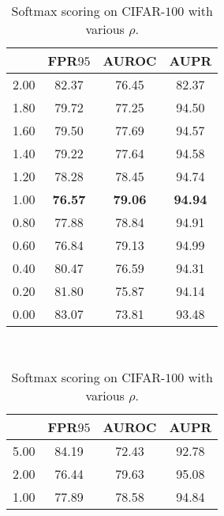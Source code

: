 \documentclass{article}
\begin{document}
\begin{table}[t]
\centering
\parbox{.30\linewidth}{
\centering
\scriptsize
\caption{Softmax scoring on CIFAR-$100$ with various $\sigma_1$.} \label{tab: ablation sigma full se cifar100}
\vspace{5pt}
{
\begin{tabular}{c|ccc}
\toprule[1.5pt]
            & FPR$95$     & AUROC       & AUPR      \\
\midrule[0.6pt]
2.00               & 82.37                  & 76.45                  & 82.37 \\
1.80               & 79.72                  & 77.25                  & 94.50 \\
1.60               & 79.50                  & 77.69                  & 94.57 \\
1.40               & 79.22                  & 77.64                  & 94.58 \\
1.20               & 78.28                  & 78.45                  & 94.74 \\ 
\cellcolor{greyC}1.00               & \cellcolor{greyC}\textbf{76.57}                  & \cellcolor{greyC}\textbf{79.06}                  & \cellcolor{greyC}\textbf{94.94} \\ 
0.80               & 77.88                  & 78.84                  & 94.91 \\
0.60               & 76.84                  & 79.13                  & 94.99 \\
0.40               & 80.47                  & 76.59                  & 94.31 \\
0.20               &  81.80                 & 75.87                  & 94.14 \\
0.00               &  83.07                 & 73.81                  & 93.48 \\
\bottomrule[1.5pt]      
\end{tabular}
}}~~
\parbox{.30\linewidth}{
\centering
\caption{Softmax scoring on CIFAR-$100$ with various $\rho$.} 
\scriptsize
\vspace{5pt}
{
\begin{tabular}{c|ccc}
\toprule[1.5pt]
            & FPR$95$     & AUROC      & AUPR      \\
\midrule[0.6pt]
5.00               & 84.19                  & 72.43                  & 92.78 \\
2.00               & 76.44                  & 79.63                  & 95.08 \\
1.00               & 77.89                  & 78.58                  & 94.84 \\

\end{tabular}}}
\end{table}
\end{document}
